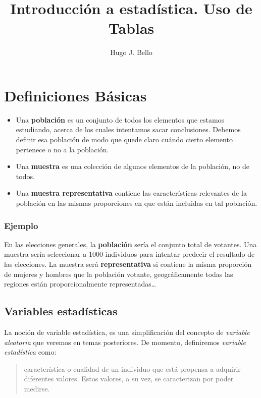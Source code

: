 \documentclass[
]{article}
\title{Introducción a estadística. Uso de Tablas}
\author{Hugo J. Bello}
\date{}
\begin{document}
\maketitle

\hypertarget{definiciones-buxe1sicas}{%
\section{Definiciones Básicas}\label{definiciones-buxe1sicas}}

\begin{itemize}
\item
  Una \textbf{población} es un conjunto de todos los elementos que
  estamos estudiando, acerca de los cuales intentamos sacar
  conclusiones. Debemos definir esa población de modo que quede claro
  cuándo cierto elemento pertenece o no a la población.
\item
  Una \textbf{muestra} es una colección de algunos elementos de la
  población, no de todos.
\item
  Una \textbf{muestra representativa} contiene las características
  relevantes de la población en las mismas proporciones en que están
  incluidas en tal población.
\end{itemize}

\hypertarget{ejemplo}{%
\subsubsection{Ejemplo}\label{ejemplo}}

En las elecciones generales, la \textbf{población} sería el conjunto
total de votantes. Una muestra sería seleccionar a 1000 individuos para
intentar predecir el resultado de las elecciones. La muestra será
\textbf{representativa} si contiene la misma proporción de mujeres y
hombres que la población votante, geográficamente todas las regiones
están proporcionalmente representadas\ldots{}

\hypertarget{variables-estaduxedsticas}{%
\subsection{Variables estadísticas}\label{variables-estaduxedsticas}}

La noción de variable estadística, es una simplificación del concepto de
\emph{variable aleatoria} que veremos en temas posteriores. De momento,
definiremos \emph{variable estadística} como:

\begin{quote}
característica o cualidad de un individuo que está propensa a adquirir
diferentes valores. Estos valores, a su vez, se caracterizan por poder
medirse.
\end{quote}
\end{document}
